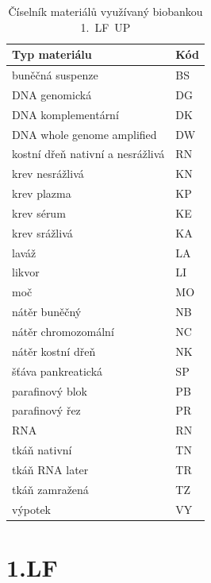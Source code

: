 \begin{appendix}
\begin{table}[ht] 
\centering
\begin{tabular}{l l}
\hline 
Typ materiálu & Kód \\
\hline \hline
buněčná suspenze 									& BS \\
DNA genomická 										& DG \\
DNA komplementární 								& DK \\
DNA whole genome amplified 				& DW \\
kostní dřeň nativní a nesrážlivá 	& RN \\
krev nesrážlivá 									& KN \\
krev plazma 											& KP \\
krev sérum 												& KE \\
krev srážlivá 										& KA \\
laváž 														& LA \\
likvor 														& LI \\
moč 															& MO \\
nátěr buněčný 										& NB \\
nátěr chromozomální 							& NC \\
nátěr kostní dřeň 								& NK \\
šťáva pankreatická  							& SP \\
parafinový blok 									& PB \\
parafinový řez 										& PR \\
RNA 															& RN \\
tkáň nativní 											& TN \\
tkáň RNA later 										& TR \\
tkáň zamražená 										& TZ \\
výpotek 													& VY \\

\hline %
\end{tabular} 
\caption{Číselník materiálů využívaný biobankou 1.~LF~UP}
\label{tab:ciselnik-mat-UP} %
\end{table} 

\section{1.LF}


\end{appendix}
